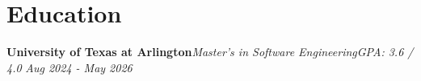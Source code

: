 \documentclass[10pt, letterpaper]{article}
\begin{document}
{%


\vspace{-0.2cm}
\section{Education}
\vspace{-0.1cm}
\textbf{University of Texas at Arlington}\hspace{3.3em}\textit{Master's in Software Engineering}\hspace{3.3em}\textit{GPA: 3.6 / 4.0} \hfill \textit{Aug 2024 - May 2026} \\

} %
\end{document}
